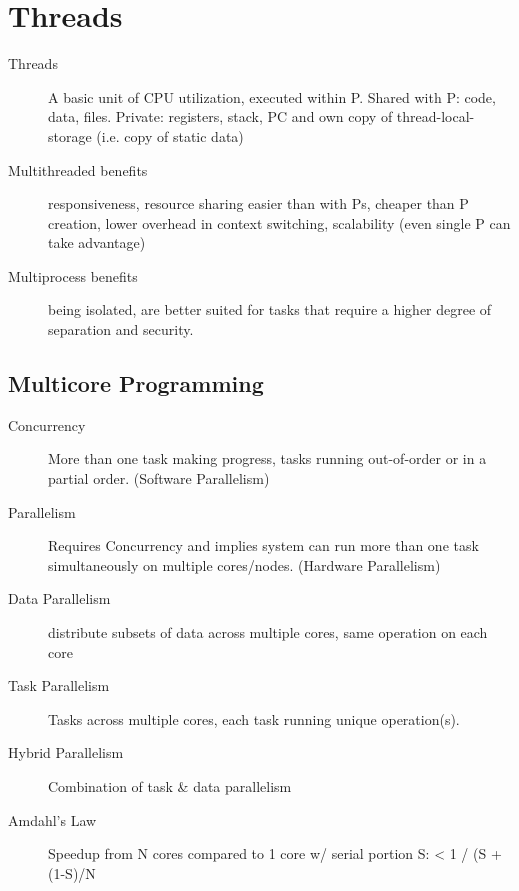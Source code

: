 \section*{Threads}
\begin{description}
  \item[Threads] A basic unit of CPU utilization, executed within P.  Shared with P: code, data, files. Private: registers, stack, PC and own copy of thread-local-storage (i.e. copy of static data)
  \item[Multithreaded benefits] responsiveness, resource sharing easier than with Ps, cheaper than P creation, lower overhead in context switching, scalability (even single P can take advantage)
  \item[Multiprocess benefits] being isolated, are better suited for tasks that require a  higher degree of separation and security.  \end{description}

\subsection*{Multicore Programming}
\begin{description}
  \item[Concurrency] More than one task making progress, tasks running out-of-order or in a partial order. (Software Parallelism)
  \item[Parallelism] Requires Concurrency and implies system can run more than one task simultaneously on multiple cores/nodes. (Hardware Parallelism)
  \item[Data Parallelism] distribute subsets of data across multiple cores, same operation on each core
  \item[Task Parallelism]  Tasks across  multiple cores, each task running unique operation(s).
  \item[Hybrid Parallelism] Combination of task \& data parallelism
  \item[Amdahl's Law] Speedup from N cores compared to 1 core w/ serial portion S: < 1 / (S + (1-S)/N
\end{description}

